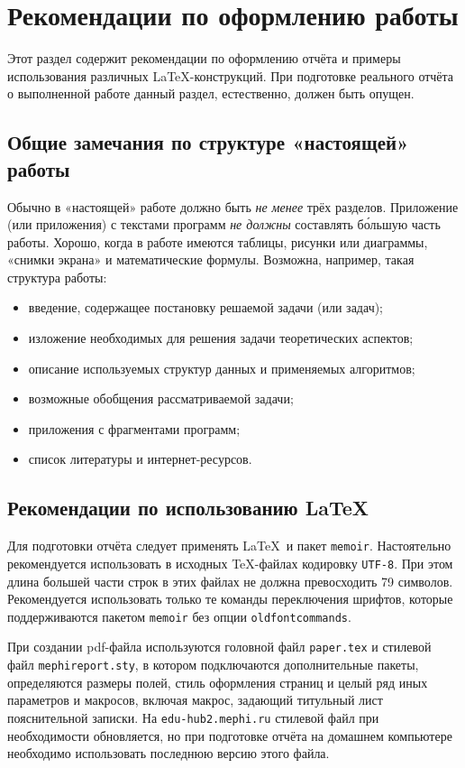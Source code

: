 \section{Рекомендации по оформлению работы}

Этот раздел содержит рекомендации по оформлению отчёта
и примеры использования различных \LaTeX-конструкций. При подготовке
реального отчёта о выполненной работе данный раздел, естественно, должен
быть опущен.

\subsection*{Общие замечания по структуре «настоящей» работы}

Обычно в «настоящей» работе должно быть \emph{не менее} трёх разделов.
Приложение
(или приложения) с текстами программ \emph{не должны} составлять б\'{о}льшую
часть работы. Хорошо, когда в работе имеются таблицы, рисунки или диаграммы,
«снимки экрана» и математические формулы. Возможна, например, такая 
структура работы:

\begin{itemize}
\item введение, содержащее постановку решаемой задачи (или задач);
\item изложение необходимых для решения задачи теоретических аспектов;
\item описание используемых структур данных и применяемых алгоритмов;
\item возможные обобщения рассматриваемой задачи;
\item приложения с фрагментами программ;
\item список литературы и интернет-ресурсов.
\end{itemize}

\subsection*{Рекомендации по использованию \LaTeX}

Для подготовки отчёта следует применять \LaTeX\ и пакет 
\texttt{memoir}. Настоятельно рекомендуется использовать в исходных 
\TeX-файлах кодировку \texttt{UTF-8}. При этом длина большей части строк в 
этих файлах не должна превосходить 79 символов. Рекомендуется 
использовать только те команды переключения шрифтов, которые поддерживаются
пакетом \verb|memoir| без опции \verb|oldfontcommands|. 

При создании pdf-файла используются головной файл \texttt{paper.tex} и 
стилевой файл \texttt{mеphireport.sty}, в котором подключаются 
дополнительные 
пакеты, определяются размеры полей, стиль оформления страниц и целый ряд иных 
параметров и макросов, включая макрос, задающий титульный лист пояснительной
записки. На \texttt{edu-hub2.mephi.ru} стилевой файл при необходимости
обновляется, но при подготовке отчёта на домашнем компьютере необходимо
использовать последнюю версию этого файла.

